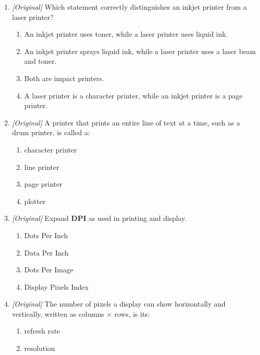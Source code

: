 \begin{enumerate}[label=\textbf{Q\arabic*.}, leftmargin=*]
  engineering drawings, maps, and CAD line drawings?
  \begin{enumerate}[label=\Alph*.]
    \item Inkjet printer
    \item Plotter
    \item Laser printer
    \item Dot matrix printer
  \end{enumerate}
\item \textit{[Original]} Which statement correctly distinguishes an inkjet
  printer from a laser printer?
  \begin{enumerate}[label=\Alph*.]
    \item An inkjet printer uses toner, while a laser printer uses liquid
      ink.
    \item An inkjet printer sprays liquid ink, while a laser printer uses a
      laser beam and toner.
    \item Both are impact printers.
    \item A laser printer is a character printer, while an inkjet printer is
      a page printer.
  \end{enumerate}
\item \textit{[Original]} A printer that prints an entire line of text at a
  time, such as a drum printer, is called a:
  \begin{enumerate}[label=\Alph*.]
    \item character printer
    \item line printer
    \item page printer
    \item plotter
  \end{enumerate}
\item \textit{[Original]} Expand \textbf{DPI} as used in printing and display.
  \begin{enumerate}[label=\Alph*.]
    \item Dots Per Inch
    \item Data Per Inch
    \item Dots Per Image
    \item Display Pixels Index
  \end{enumerate}
\item \textit{[Original]} The number of pixels a display can show
  horizontally and vertically, written as columns $\times$ rows, is its:
  \begin{enumerate}[label=\Alph*.]
    \item refresh rate
    \item resolution

\end{enumerate}
\end{enumerate}
